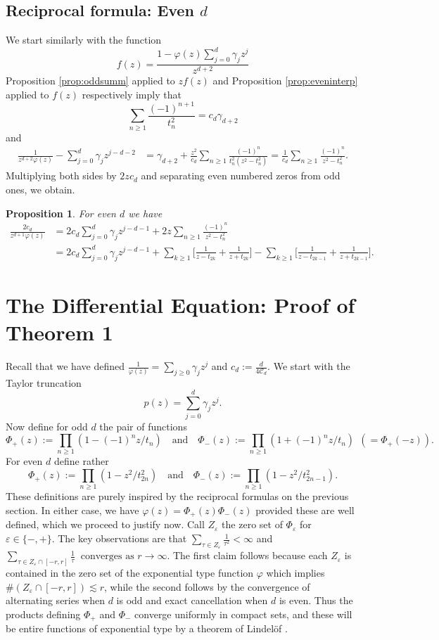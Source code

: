\documentclass[a4paper,reqno,12pt]{amsart}
\newtheorem{proposition}[theorem]{Proposition}\newtheorem{corollary}[theorem]{Corollary}
\newcommand{\C}{\mathscr{C}}
\renewcommand{\P}{\Phi}
\newcommand{\ga}{\gamma}
\newcommand{\ep}{\varepsilon}
\newcommand{\remarkr}[1]{\textcolor{red}{#1}}
\newcommand{\p}{\varphi}
\begin{document}
 \subsection{Reciprocal formula: Even \texorpdfstring{$d$}{d}} %
We start similarly with the function
$$
f(z)=\frac{1-\p(z)\sum_{j=0}^{d} \ga_j z^j}{z^{d+2}}
$$
Proposition \ref{prop:oddsumm} applied to $z f(z)$ and Proposition \ref{prop:eveninterp} applied to $f(z)$ respectively imply that
$$
\sum_{n\geq 1} \frac{(-1)^{n+1}}{t_n^2} = c_d \ga_{d+2}
$$
and
\begin{align*}
\frac{1}{z^{d+2}\p(z)} - \sum_{j=0}^{d} \ga_j z^{j-d-2} & = \ga_{d+2} +\frac{z^2}{c_d}\sum_{n\geq 1} \frac{(-1)^{n}}{t_n^2(z^2-t_n^2)} = \frac{1}{c_d}\sum_{n\geq 1} \frac{(-1)^n}{z^2- t_n^2}.
\end{align*}
Multiplying both sides by $2zc_d$ and separating even numbered zeros from odd ones, we obtain.

\begin{proposition}\label{prop:reciprocalformulaeven}
For even $d$ we have
\begin{align*}
\frac{2c_d}{z^{d+1}\p(z)} & = 2 c_d \sum_{j=0}^{d} \ga_j z^{j-d-1} +2z \sum_{n\geq 1} \frac{(-1)^n}{z^2- t_n^2} \\ 
& = 2 c_d \sum_{j=0}^{d} \ga_j z^{j-d-1} +\sum_{k\geq 1}\bigg[ \frac{1}{z-t_{2k}}+\frac{1}{z+t_{2k}}\bigg] - \sum_{k\geq 1}\bigg[ \frac{1}{z-t_{2k-1}}+\frac{1}{z+t_{2k-1}}\bigg] .
\end{align*}
\end{proposition}

\section{The Differential Equation: Proof of Theorem 1}
Recall that we have defined $\frac{1}{\p(z)} = \sum_{j\geq 0} \ga_j z^j$ and $c_d:= \frac{d}{4\C_d}$. We start with the Taylor truncation
$$
    p(z)=\sum_{j=0}^{d} \ga_j z^{j}.
$$
Now define for odd $d$ the pair of functions
$$
\P_+(z) := \prod_{n\geq 1} (1-(-1)^nz/t_n) \quad \text{and} \quad \P_-(z) :=\prod_{n\geq 1} (1+(-1)^nz/t_n) \ \ (=\Phi_+(-z)).
$$
For even $d$ define rather
$$
\P_+(z) := \prod_{n\geq 1} (1-z^2/t_{2n}^2) \quad \text{and} \quad \P_-(z) :=\prod_{n\geq 1}  (1-z^2/t_{2n-1}^2).
$$
These definitions are purely inspired by the reciprocal formulas on the previous section. In either case, we have $\p(z) = \P_+ (z)\P_-(z)$ provided these are well defined, which we proceed to justify now. Call $Z_\ep$ the zero set of $\P_\ep$ for $\ep \in \{-,+ \}$. The key observations are that
$\sum_{\tau \in Z_\ep} \frac{1}{\tau^2} < \infty$ and $\sum_{\tau \in Z_\ep\cap [-r, r]} \frac{1}{\tau} \ \text{ converges as } r\to\infty$.
The first claim follows because each $Z_\ep$ is contained in the zero set of the exponential type function $\p$ which implies $\#(Z_\ep \cap [-r, r])  \lesssim r$, while the second follows by the convergence of alternating series when $d$ is odd and exact cancellation when $d$ is even. Thus the products defining $\P_+$ and $\P_-$ converge uniformly in compact sets, and these will be entire functions of exponential type by a theorem of Lindelöf \cite[p. 20]{K}.  
\end{document}
